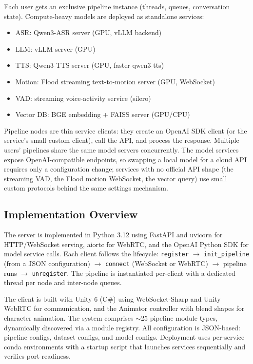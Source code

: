 \documentclass[11pt,a4paper]{article}
\begin{document}
Each user gets an exclusive pipeline instance (threads, queues, conversation state). Compute-heavy models are deployed as standalone services:
\begin{itemize}[nosep]
    \item ASR: Qwen3-ASR server (GPU, vLLM backend)
    \item LLM: vLLM server (GPU)
    \item TTS: Qwen3-TTS server (GPU, faster-qwen3-tts)
    \item Motion: Flood streaming text-to-motion server (GPU, WebSocket)
    \item VAD: streaming voice-activity service (silero)
    \item Vector DB: BGE embedding + FAISS server (GPU/CPU)
\end{itemize}

Pipeline nodes are thin service clients: they create an OpenAI SDK client (or the service's small custom client), call the API, and process the response. Multiple users' pipelines share the same model servers concurrently. The model services expose OpenAI-compatible endpoints, so swapping a local model for a cloud API requires only a configuration change; services with no official API shape (the streaming VAD, the Flood motion WebSocket, the vector query) use small custom protocols behind the same settings mechanism.

\subsection{Implementation Overview}

The server is implemented in Python 3.12 using FastAPI and uvicorn for HTTP/WebSocket serving, aiortc for WebRTC, and the OpenAI Python SDK for model service calls. Each client follows the lifecycle: \texttt{register} $\rightarrow$ \texttt{init\_pipeline} (from a JSON configuration) $\rightarrow$ \texttt{connect} (WebSocket or WebRTC) $\rightarrow$ pipeline runs $\rightarrow$ \texttt{unregister}. The pipeline is instantiated per-client with a dedicated thread per node and inter-node queues.

The client is built with Unity 6 (C\#) using WebSocket-Sharp and Unity WebRTC for communication, and the Animator controller with blend shapes for character animation. The system comprises $\sim$25 pipeline module types, dynamically discovered via a module registry. All configuration is JSON-based: pipeline configs, dataset configs, and model configs. Deployment uses per-service conda environments with a startup script that launches services sequentially and verifies port readiness.
\end{document}
